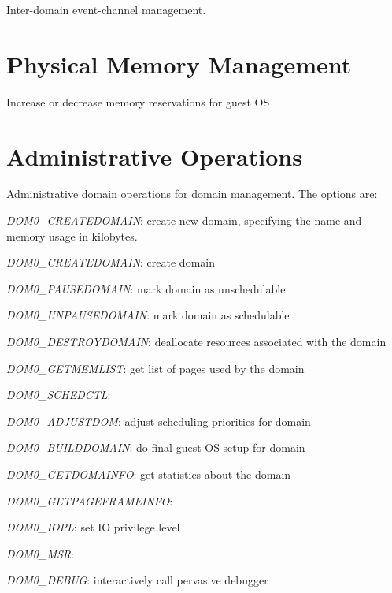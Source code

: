 \documentclass[11pt,twoside,final,openright]{xenstyle}
\begin{document}

Inter-domain event-channel management.





\section{Physical Memory Management}


Increase or decrease memory reservations for guest OS






\section{Administrative Operations}
\label{s:dom0ops}


Administrative domain operations for domain management. The options are:

{\it DOM0\_CREATEDOMAIN}: create new domain, specifying the name and memory usage
in kilobytes.

{\it DOM0\_CREATEDOMAIN}: create domain

{\it DOM0\_PAUSEDOMAIN}: mark domain as unschedulable

{\it DOM0\_UNPAUSEDOMAIN}: mark domain as schedulable

{\it DOM0\_DESTROYDOMAIN}: deallocate resources associated with the domain

{\it DOM0\_GETMEMLIST}: get list of pages used by the domain

{\it DOM0\_SCHEDCTL}:

{\it DOM0\_ADJUSTDOM}: adjust scheduling priorities for domain

{\it DOM0\_BUILDDOMAIN}: do final guest OS setup for domain

{\it DOM0\_GETDOMAINFO}: get statistics about the domain

{\it DOM0\_GETPAGEFRAMEINFO}:

{\it DOM0\_IOPL}: set IO privilege level

{\it DOM0\_MSR}:

{\it DOM0\_DEBUG}: interactively call pervasive debugger
\end{document}
